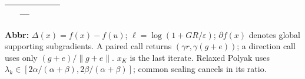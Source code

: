 \begin{table}[tp]
\begin{threeparttable}
\begin{tabularx}{\linewidth}{@{}>{\raggedright\arraybackslash}p{0.20\linewidth}>{\raggedright\arraybackslash}p{0.32\linewidth}>{\raggedright\arraybackslash}p{0.25\linewidth}>{\raggedright\arraybackslash}X@{}}
& --- \\
\bottomrule
\end{tabularx}
\begin{tablenotes}[flushleft]\footnotesize
\item[] \textbf{Abbr:} $\Delta(x)=f(x)-f(u)$; $\ell=\log(1+GR/\varepsilon)$; $\partial f(x)$ denotes global supporting subgradients. A paired call returns $(\gamma r,\gamma(g+e))$; a direction call uses only $(g+e)/\|g+e\|$. $x_K$ is the last iterate. Relaxed Polyak uses $\lambda_k\in[2\alpha/(\alpha+\beta),2\beta/(\alpha+\beta)]$; common scaling cancels in its ratio.
\end{tablenotes}
\end{threeparttable}
\end{table}

